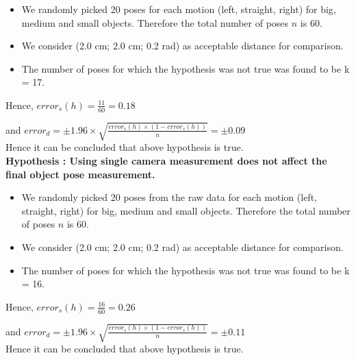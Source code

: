 \documentclass[10pt,a4paper]{article}
\begin{document}
					\begin{itemize}
						\item We randomly picked 20 poses for each motion (left, straight, right) for big, medium and small objects. Therefore the total number of poses $n$ is 60.
						
						\item We consider (2.0 cm; 2.0 cm; 0.2 rad) as acceptable distance for comparison.
						
						\item The number of poses for which the hypothesis was not true was found to be k = 17.
					\end{itemize}
					
					Hence, $error_s (h) = \frac{11}{60} = 0.18 $
					
					and $error_d = \pm 1.96 \times \sqrt{\frac{error_s (h) \times (1-error_s (h))}{n}} = \pm0.09$\\
					
					Hence it can be concluded that above hypothesis is true. \\
					
					\textbf{Hypothesis : Using single camera measurement does not affect the final object pose measurement.}
					
					\begin{itemize}
						\item We randomly picked 20 poses from the raw data for each motion (left, straight, right) for big, medium and small objects. Therefore the total number of poses $n$ is 60.
						
						\item We consider (2.0 cm; 2.0 cm; 0.2 rad) as acceptable distance for comparison.
						
						\item The number of poses for which the hypothesis was not true was found to be k = 16.
					\end{itemize}
					
					Hence, $error_s (h) = \frac{16}{60} = 0.26 $
					
					and $error_d = \pm 1.96 \times \sqrt{\frac{error_s (h) \times (1-error_s (h))}{n}} = \pm0.11$\\
					
					Hence it can be concluded that above hypothesis is true.
					
\end{document}
